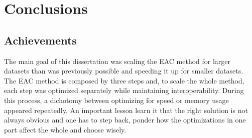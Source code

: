 
\chapter{Conclusions}
\label{chapter:conclusions}




\section{Achievements}
\label{section:achievements}

The main goal of this dissertation was scaling the EAC method for larger datasets than was previously possible and speeding it up for smaller datasets.
The EAC method is composed by three steps and, to scale the whole method, each step was optimized separately while maintaining interoperability.
During this process, a dichotomy between optimizing for speed or memory usage appeared repeatedly.
An important lesson learn it that the right solution is not always obvious and one has to step back, ponder how the optimizations in one part affect the whole and choose wisely.

